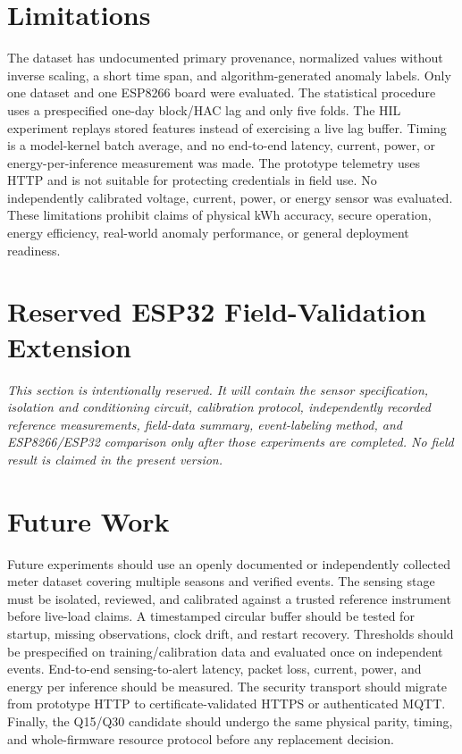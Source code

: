 \documentclass[10pt,a4paper,twocolumn]{article}
\begin{document}
\section{Limitations}
The dataset has undocumented primary provenance, normalized values without inverse scaling, a short time span, and algorithm-generated anomaly labels. Only one dataset and one ESP8266 board were evaluated. The statistical procedure uses a prespecified one-day block/HAC lag and only five folds. The HIL experiment replays stored features instead of exercising a live lag buffer. Timing is a model-kernel batch average, and no end-to-end latency, current, power, or energy-per-inference measurement was made. The prototype telemetry uses HTTP and is not suitable for protecting credentials in field use. No independently calibrated voltage, current, power, or energy sensor was evaluated. These limitations prohibit claims of physical kWh accuracy, secure operation, energy efficiency, real-world anomaly performance, or general deployment readiness.

\section{Reserved ESP32 Field-Validation Extension}
\textit{This section is intentionally reserved. It will contain the sensor specification, isolation and conditioning circuit, calibration protocol, independently recorded reference measurements, field-data summary, event-labeling method, and ESP8266/ESP32 comparison only after those experiments are completed. No field result is claimed in the present version.}

\section{Future Work}
Future experiments should use an openly documented or independently collected meter dataset covering multiple seasons and verified events. The sensing stage must be isolated, reviewed, and calibrated against a trusted reference instrument before live-load claims. A timestamped circular buffer should be tested for startup, missing observations, clock drift, and restart recovery. Thresholds should be prespecified on training/calibration data and evaluated once on independent events. End-to-end sensing-to-alert latency, packet loss, current, power, and energy per inference should be measured. The security transport should migrate from prototype HTTP to certificate-validated HTTPS or authenticated MQTT. Finally, the Q15/Q30 candidate should undergo the same physical parity, timing, and whole-firmware resource protocol before any replacement decision.
\end{document}

